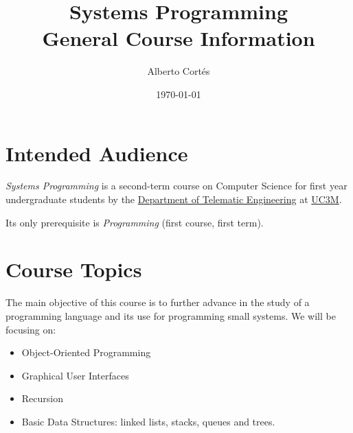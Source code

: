 \documentclass[11pt, a4paper, twoside]{article}
\begin{document}
\title{Systems Programming\\General Course Information}
\author{Alberto Cortés}
\date{\today}
\maketitle


\section{Intended Audience}

\emph{Systems Programming} is a second-term course on Computer Science for
first year undergraduate students by the \href{http://it.uc3m.es}{Department of
Telematic Engineering} at \href{http://uc3m.es}{UC3M}.


Its only prerequisite is \emph{Programming} (first course, first term).

\section{Course Topics}

The main objective of this course is to further advance in the study of a
programming language and its use for programming small systems. We will be
focusing on:

\begin{itemize}

  \item Object-Oriented Programming

  \item Graphical User Interfaces

  \item Recursion

  \item Basic Data Structures: linked lists, stacks, queues and trees.

\end{itemize}
\end{document}
